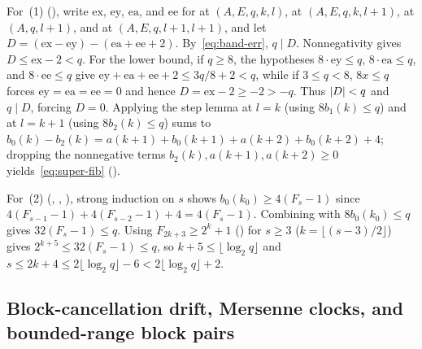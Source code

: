 \begin{outline}
For~(1) (), write $\mathrm{ex}$, $\mathrm{ey}$, $\mathrm{ea}$, and $\mathrm{ee}$ for
 at $(A, E, q, k, l)$,  at $(A, E, q, k, l+1)$,  at $(A, q, l+1)$,
and  at $(A, E, q, l+1, l+1)$, and let $D = (\mathrm{ex} - \mathrm{ey}) - (\mathrm{ea} + \mathrm{ee} + 2)$.
By~\eqref{eq:band-err}, $q \mid D$. Nonnegativity gives $D \le \mathrm{ex} - 2 < q$. For the lower bound, if $q \ge 8$, the
hypotheses $8 \cdot \mathrm{ey} \le q$, $8 \cdot \mathrm{ea} \le q$, and $8 \cdot \mathrm{ee} \le q$ give $\mathrm{ey} +
\mathrm{ea} + \mathrm{ee} + 2 \le 3q/8 + 2 < q$, while if $3 \le q < 8$, $8 x \le q$ forces $\mathrm{ey} = \mathrm{ea} =
\mathrm{ee} = 0$ and hence $D = \mathrm{ex} - 2 \ge -2 > -q$. Thus $\lvert D \rvert < q$ and $q \mid D$, forcing $D = 0$. Applying
the step lemma  at $l = k$ (using $8 b_1(k) \le q$) and at $l = k + 1$ (using $8 b_2(k) \le q$) sums to
$b_0(k) - b_2(k) = a(k+1) + b_0(k+1) + a(k+2) + b_0(k+2) + 4$; dropping the nonnegative terms $b_2(k), a(k+1), a(k+2) \ge 0$
yields~\eqref{eq:super-fib} ().

For~(2) (, , ), strong induction on $s$
shows $b_0(k_0) \ge 4(F_s - 1)$ since $4(F_{s-1} - 1) + 4(F_{s-2} - 1) + 4 = 4(F_s - 1)$. Combining with $8 b_0(k_0) \le q$
gives $32(F_s - 1) \le q$. Using $F_{2k+3} \ge 2^k + 1$ () for $s \ge 3$ ($k = \lfloor (s-3)/2
\rfloor$) gives $2^{k+5} \le 32(F_s - 1) \le q$, so $k + 5 \le \lfloor \log_2 q \rfloor$ and $s \le 2k + 4 \le 2\lfloor
\log_2 q \rfloor - 6 < 2\lfloor \log_2 q \rfloor + 2$.
\end{outline}

\subsection{Block-cancellation drift, Mersenne clocks, and bounded-range block pairs}\label{sec:dnp-block}

